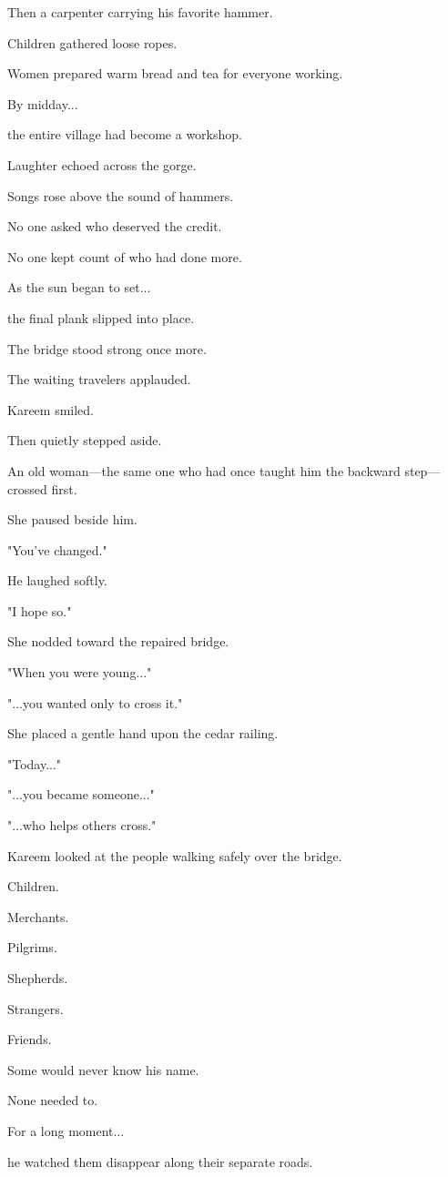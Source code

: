 \documentclass[12pt,openany]{book}
\begin{document}
Then a carpenter carrying his favorite hammer.

Children gathered loose ropes.

Women prepared warm bread and tea for everyone working.

By midday...

the entire village had become a workshop.

Laughter echoed across the gorge.

Songs rose above the sound of hammers.

No one asked who deserved the credit.

No one kept count of who had done more.

As the sun began to set...

the final plank slipped into place.

The bridge stood strong once more.

The waiting travelers applauded.

Kareem smiled.

Then quietly stepped aside.

An old woman—the same one who had once taught him the backward step—crossed first.

She paused beside him.

"You've changed."

He laughed softly.

"I hope so."

She nodded toward the repaired bridge.

"When you were young..."

"...you wanted only to cross it."

She placed a gentle hand upon the cedar railing.

"Today..."

"...you became someone..."

"...who helps others cross."

Kareem looked at the people walking safely over the bridge.

Children.

Merchants.

Pilgrims.

Shepherds.

Strangers.

Friends.

Some would never know his name.

None needed to.

For a long moment...

he watched them disappear along their separate roads.
\end{document}
